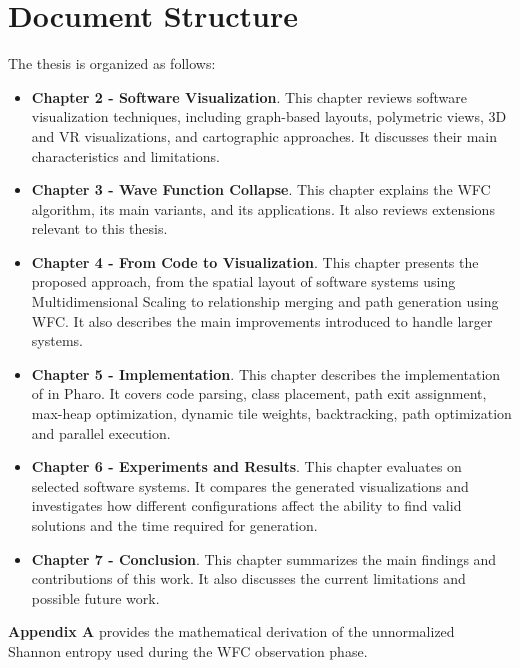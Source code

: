 \documentclass[../main.tex]{subfiles}
\begin{document}
\section{Document Structure}
The thesis is organized as follows:

\begin{itemize}

    \item \textbf{Chapter 2 - Software Visualization}. This chapter reviews software visualization techniques, including graph-based layouts, polymetric views, 3D and VR visualizations, and cartographic approaches. It discusses their main characteristics and limitations.

    \item \textbf{Chapter 3 - Wave Function Collapse}. This chapter explains the WFC algorithm, its main variants, and its applications. It also reviews extensions relevant to this thesis.

    \item \textbf{Chapter 4 - From Code to Visualization}. This chapter presents the proposed approach, from the spatial layout of software systems using Multidimensional Scaling to relationship merging and path generation using WFC. It also describes the main improvements introduced to handle larger systems.

    \item \textbf{Chapter 5 - Implementation}. This chapter describes the implementation of \wassis in Pharo. It covers code parsing, class placement, path exit assignment, max-heap optimization, dynamic tile weights, backtracking, path optimization and parallel execution.

    \item \textbf{Chapter 6 - Experiments and Results}. This chapter evaluates \wassis on selected software systems. It compares the generated visualizations and investigates how different configurations affect the ability to find valid solutions and the time required for generation.

    \item \textbf{Chapter 7 - Conclusion}. This chapter summarizes the main findings and contributions of this work. It also discusses the current limitations and possible future work.

\end{itemize}

\textbf{Appendix A} provides the mathematical derivation of the unnormalized Shannon entropy used during the WFC observation phase.
\end{document}
